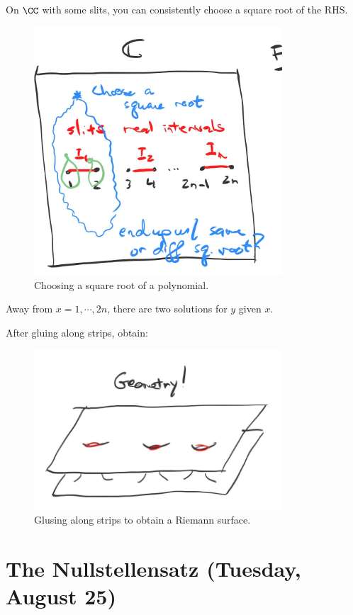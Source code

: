 \begin{fact}

On \(\CC\) with some slits, you can consistently choose a square root of
the RHS.

\begin{figure}
\centering
\includegraphics[width=3.64583in,height=\textheight]{figures/image_2020-08-21-01-31-47.png}
\caption{Choosing a square root of a polynomial.}
\end{figure}

Away from \(x=1, \cdots, 2n\), there are two solutions for \(y\) given
\(x\).

After gluing along strips, obtain:

\begin{figure}
\centering
\includegraphics[width=3.64583in,height=\textheight]{figures/image_2020-08-21-01-32-48.png}
\caption{Glusing along strips to obtain a Riemann surface.}
\end{figure}

\end{fact}

\hypertarget{the-nullstellensatz-tuesday-august-25}{%
\section{The Nullstellensatz (Tuesday, August
25)}\label{the-nullstellensatz-tuesday-august-25}}

